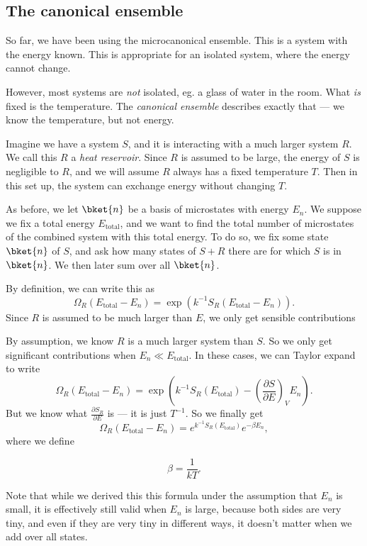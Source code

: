 \documentclass[a4paper]{article}
\begin{document}
\subsection{The canonical ensemble}
So far, we have been using the microcanonical ensemble. This is a system with the energy known. This is appropriate for an isolated system, where the energy cannot change.

However, most systems are \emph{not} isolated, eg. a glass of water in the room. What \emph{is} fixed is the temperature. The \emph{canonical ensemble} describes exactly that --- we know the temperature, but not energy.

Imagine we have a system $S$, and it is interacting with a much larger system $R$. We call this $R$ a \emph{heat reservoir}. Since $R$ is assumed to be large, the energy of $S$ is negligible to $R$, and we will assume $R$ always has a fixed temperature $T$. Then in this set up, the system can exchange energy without changing $T$.

As before, we let $\bket{n}$ be a basis of microstates with energy $E_n$. We suppose we fix a total energy $E_{\mathrm{total}}$, and we want to find the total number of microstates of the combined system with this total energy. To do so, we fix some state $\bket{n}$ of $S$, and ask how many states of $S + R$ there are for which $S$ is in $\bket{n}$. We then later sum over all $\bket{n}$.

By definition, we can write this as
\[
  \Omega_R(E_{\mathrm{total}} - E_n) = \exp\left(k^{-1} S_R(E_{\mathrm{total}} - E_n)\right).
\]
Since $R$ is assumed to be much larger than $E$, we only get sensible contributions

By assumption, we know $R$ is a much larger system than $S$. So we only get significant contributions when $E_n \ll E_{\mathrm{total}}$. In these cases, we can Taylor expand to write
\[
  \Omega_R(E_{\mathrm{total}} - E_n) = \exp\left(k^{-1} S_R(E_{\mathrm{total}}) - \left(\frac{\partial S}{\partial E}\right)_V E_n\right).
\]
But we know what $\frac{\partial S_R}{\partial E}$ is --- it is just $T^{-1}$. So we finally get
\[
  \Omega_R(E_{\mathrm{total}} - E_n) = e^{k^{-1}S_R(E_{\mathrm{total}})} e^{-\beta E_n},
\]
where we define
\begin{defi}[$\beta$]\index{$\beta$}
  \[
    \beta = \frac{1}{kT}.
  \]
\end{defi}
Note that while we derived this this formula under the assumption that $E_n$ is small, it is effectively still valid when $E_n$ is large, because both sides are very tiny, and even if they are very tiny in different ways, it doesn't matter when we add over all states.
\end{document}

